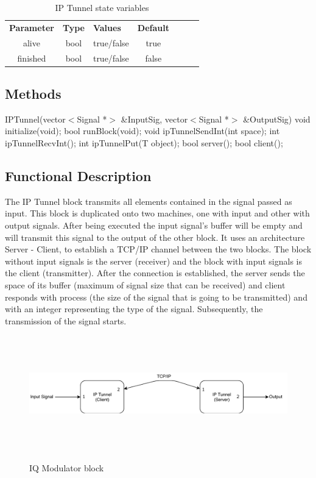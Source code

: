 \begin{table}[h]
	\centering
	\begin{tabular}{|c|c|p{30mm}|c|ccp{60mm}}
		\cline{1-4}
		\textbf{Parameter} & \textbf{Type} & \textbf{Values} &   \textbf{Default}& \\ \cline{1-4}
		alive & bool & true/false & true \\ \cline{1-4}
        finished & bool & true/false & false \\ \cline{1-4}
	
	\end{tabular}
	\caption{IP Tunnel state variables}
	\label{table:iptunnel_st_var}
\end{table}

\subsection*{Methods}
%
IPTunnel(vector$<$Signal *$>$ \&InputSig, vector$<$Signal *$>$ \&OutputSig)
\bigbreak
void initialize(void);
\bigbreak
bool runBlock(void);
\bigbreak
void ipTunnelSendInt(int space);
\bigbreak
int ipTunnelRecvInt();
\bigbreak
int ipTunnelPut(T object);
\bigbreak
bool server();
\bigbreak
bool client();


\subsection*{Functional Description}

The IP Tunnel block transmits all elements contained in the signal passed as input. This block is duplicated onto two machines, one with input and other with output signals. After being executed the input signal's buffer will be empty and will transmit this signal to the output of the other block. It uses an architecture Server - Client, to establish a TCP/IP channel between the two blocks. The block without input signals is the server (receiver) and the block with input signals is the client (transmitter). After the connection is established, the server sends the space of its buffer (maximum of signal size that can be received) and client responds with process (the size of the signal that is going to be transmitted) and with an integer representing the type of the signal. Subsequently, the transmission of the signal starts.

\begin{figure}[h]
	\centering
	\includegraphics[width=4\textwidth, height=5cm]{./lib/ip_tunnel/figures/StructureTCPIP.pdf}
	\label{IP Tunnel Block}\caption{IQ Modulator block}
\end{figure}